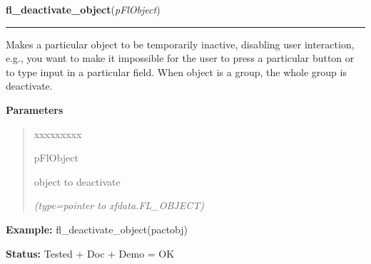 \hspace{.8\funcindent}\begin{boxedminipage}{\funcwidth}

    \raggedright \textbf{fl\_deactivate\_object}(\textit{pFlObject})

    \vspace{-1.5ex}

    \rule{\textwidth}{0.5\fboxrule}
\setlength{\parskip}{2ex}
    Makes a particular object to be temporarily inactive, disabling user 
    interaction, e.g., you want to make it impossible for the user to press
    a particular button or to type input in a particular field. When object
    is a group, the whole group is deactivate.

\setlength{\parskip}{1ex}
      \textbf{Parameters}
      \vspace{-1ex}

      \begin{quote}
        \begin{Ventry}{xxxxxxxxx}

          \item[pFlObject]

          object to deactivate

            {\it (type=pointer to xfdata.FL\_OBJECT)}

        \end{Ventry}

      \end{quote}

\textbf{Example:} fl\_deactivate\_object(pactobj)



\textbf{Status:} Tested + Doc + Demo = OK



    \end{boxedminipage}

    \label{xformslib:flbasic:fl_object_is_active}

    \vspace{0.5ex}

